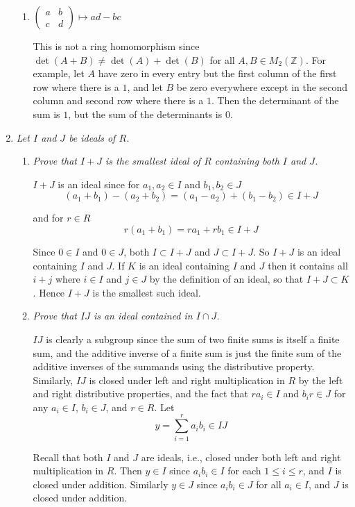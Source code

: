 \documentclass[letterpaper, 11pt]{article}
\newcommand{\Z}{\mathbb{Z}}
\begin{document}
\begin{enumerate}
\begin{enumerate}
\item $\left( \begin{array}{cc} a & b \\ c & d \end{array}\right) \mapsto ad - bc$

This is not a ring homomorphism since $\det(A+B) \neq \det(A) + \det(B)$ for all $A,B \in M_2(\Z)$.  For example, let $A$ have zero in every entry but the first column of the first row where there is a $1$, and let $B$ be zero everywhere except in the second column and second row where there is a $1$.  Then the determinant of the sum is $1$, but the sum of the determinants is $0$.

\end{enumerate}

\item \emph{Let $I$ and $J$ be ideals of $R$.}
\begin{enumerate}
\item \emph{Prove that $I+J$ is the smallest ideal of $R$ containing both $I$ and $J$.}

$I+J$ is an ideal since for $a_1, a_2 \in I$ and $b_1,b_2 \in J$
\[
(a_1+b_1) - (a_2+b_2) = (a_1 - a_2) + (b_1 - b_2) \in I+J
\]

and for $r \in R$
\[
r(a_1 + b_1) = ra_1 + rb_1 \in I+J
\]

Since $0 \in I$ and $0 \in J$, both $I \subset I+J$ and $J \subset I+J$.  So $I+J$ is an ideal containing $I$ and $J$.  If $K$ is an ideal containing $I$ and $J$ then it contains all $i+j$ where $i \in I$ and $j \in J$ by the definition of an ideal, so that $I+J \subset K$.  Hence $I+J$ is the smallest such ideal.

\item \emph{Prove that $IJ$ is an ideal contained in $I \cap J$.}

$IJ$ is clearly a subgroup since the sum of two finite sums is itself a finite sum, and the additive inverse of a finite sum is just the finite sum of the additive inverses of the summands using the distributive property.  Similarly, $IJ$ is closed under left and right multiplication in $R$ by the left and right distributive properties, and the fact that $ra_i \in I$ and $b_ir \in J$ for any $a_i \in I$, $b_i \in J$, and $r \in R$.  Let
\[
y = \sum_{i=1}^r a_ib_i \in IJ
\]

Recall that both $I$ and $J$ are ideals, i.e., closed under both left and right multiplication in $R$.  Then $y \in I$ since $a_ib_i \in I$ for each $1 \leq i \leq r$, and $I$ is closed under addition.  Similarly $y \in J$ since $a_ib_i \in J$ for all $a_i \in I$, and $J$ is closed under addition.


\end{enumerate}
\end{enumerate}
\end{document}
